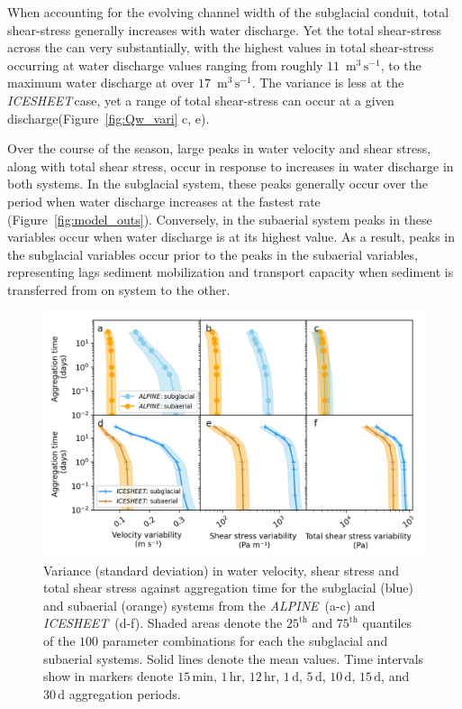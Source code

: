 \documentclass[11pt]{article}
\newcommand{\alpine}{\textit{ALPINE}\,}
\newcommand{\icesheet}{\textit{ICESHEET}\,}
\newcommand{\unit}[1]{$\mathrm{#1}$}
\begin{document}
When accounting for the evolving channel width of the subglacial conduit, total shear-stress generally increases with water discharge.
Yet the total shear-stress across the can very substantially, with the highest values in total shear-stress occurring at water discharge values ranging from roughly $11$ \,\unit{m}$^3$\,\unit{s}$^{-1}$, to the maximum water discharge at over $17$ \,\unit{m}$^3$\,\unit{s}$^{-1}$.
The variance is less at the \icesheet case, yet a range of total shear-stress can occur at a given discharge(Figure~\ref{fig:Qw_vari} c, e).

Over the course of the season, large peaks in water velocity and shear stress, along with total shear stress, occur in response to increases in water discharge in both systems.
In the subglacial system, these peaks generally occur over the period when water discharge increases at the fastest rate (Figure~\ref{fig:model_outs}).
Conversely, in the subaerial system peaks in these variables occur when water discharge is at its highest value.
As a result, peaks in the subglacial variables occur prior to the peaks in the subaerial variables, representing lags sediment mobilization and  transport capacity when sediment is transferred from on system to the other.

\begin{center}
  \begin{figure}[h]
    \includegraphics[width=0.8\linewidth]{Fig4.png}
    \caption{Variance (standard deviation) in water velocity, shear stress and total shear stress against aggregation time for the subglacial (blue) and subaerial (orange) systems from the \alpine{} (a-c) and \icesheet{} (d-f).
      Shaded areas denote the $25^{\mathrm{th}}$ and $75^{\mathrm{th}}$ quantiles of the $100$ parameter combinations for each the subglacial and subaerial systems.
      Solid lines denote the mean values.
      Time intervals show in markers denote $15$\,\unit{min}, $1$\,\unit{hr}, $12$\,\unit{hr}, $1$\,\unit{d}, $5$\,\unit{d}, $10$\,\unit{d}, $15$\,\unit{d}, and $30$\,\unit{d} aggregation periods.
    } 
    \label{fig:multi_run}
  \end{figure}
\end{center}
\end{document}
